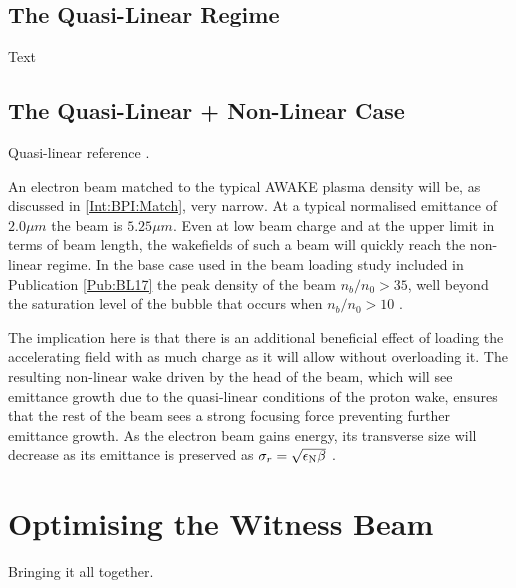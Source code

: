 \subsection{The Quasi-Linear Regime}
\label{Sim:QLin}

Text


\subsection{The Quasi-Linear + Non-Linear Case}
\label{Sim:QLinNonLin}

Quasi-linear reference \cite{rosenzweig:2010}.

An electron beam matched to the typical AWAKE plasma density will be, as discussed in \ref{Int:BPI:Match}, very narrow. At a typical normalised emittance of $2.0\unit{\mu m}$ the beam is $5.25\unit{\mu m}$. Even at low beam charge and at the upper limit in terms of beam length, the wakefields of such a beam will quickly reach the non-linear regime. In the base case used in the beam loading study included in Publication \ref{Pub:BL17} \cite{berglyd_olsen:2018} the peak density of the beam $n_b/n_0 > 35$, well beyond the saturation level of the bubble that occurs when $n_b/n_0 > 10$ \cite{lu:2005}.

The implication here is that there is an additional beneficial effect of loading the accelerating field with as much charge as it will allow without overloading it. The resulting non-linear wake driven by the head of the beam, which will see emittance growth due to the quasi-linear conditions of the proton wake, ensures that the rest of the beam sees a strong focusing force preventing further emittance growth. As the electron beam gains energy, its transverse size will decrease as its emittance is preserved as $\sigma_{r} = \sqrt{\epsilon_{\mathrm{N}}\beta}$ \cite{wille:2001}.


\section{Optimising the Witness Beam}
\label{Sim:Opt}

Bringing it all together.


